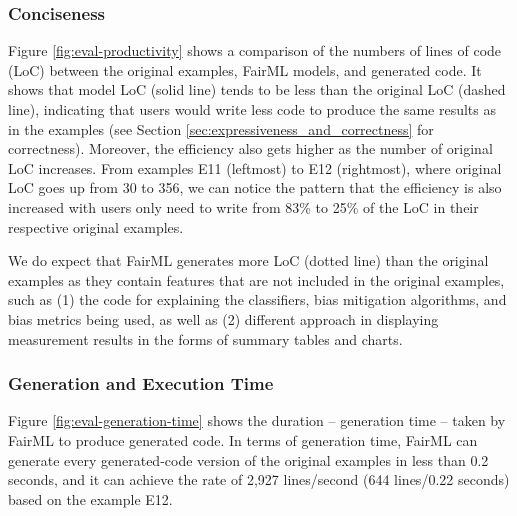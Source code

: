 \documentclass[sigconf,review]{acmart}
\begin{document}
{	%
	
	
	
	\subsubsection{Conciseness}
	\label{sec:productivity}
	
	Figure \ref{fig:eval-productivity} shows a comparison of the numbers of lines of code (LoC) between the original examples, FairML models, and generated code. It shows that model LoC (solid line) tends to be less than the original LoC (dashed line), indicating that users would write less code to produce the same results as in the examples (see Section \ref{sec:expressiveness_and_correctness} for correctness). Moreover, the efficiency also gets higher as the number of original LoC increases. From examples \textsf{E11} (leftmost) to \textsf{E12} (rightmost), where original LoC goes up from 30 to 356, we can notice the pattern that the efficiency is also increased with users only need to write from 83\% to 25\% of the LoC in their respective original examples.
	
	We do expect that FairML generates more LoC (dotted line) than the original examples as they contain features that are not included in the original examples, such as (1) the code for explaining the classifiers, bias mitigation algorithms, and bias metrics being used, as well as (2) different approach in displaying measurement results in the forms of summary tables and charts. 
	
	
	
	
	\subsubsection{Generation and Execution Time}
	\label{sec:execution_time}
	
	Figure \ref{fig:eval-generation-time} shows the duration -- generation time -- taken by FairML to produce generated code. 	
	In terms of generation time, 
	FairML can generate every generated-code version of the original examples in less than 0.2 seconds, 
	and it can achieve the rate of 2,927 lines/second (644 lines/0.22 seconds) based on the example E12. 
	
}
\end{document}
